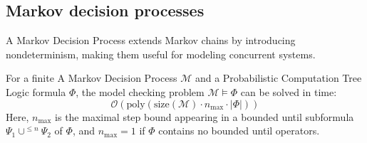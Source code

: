 \subsection{Markov decision processes}
A Markov Decision Process extends Markov chains by introducing nondeterminism, making them useful for modeling concurrent systems.
\begin{theorem}
    For a finite A Markov Decision Process $\mathcal{M}$ and a Probabilistic Computation Tree Logic formula $\Phi$, the model checking problem $\mathcal{M} \models \Phi$ can be solved in time:
       \[\mathcal{O}\left(\text{poly}\left(\text{size}\left(\mathcal{M}\right)\cdot n_{\max}\cdot\left\lvert \Phi\right\rvert\right)\right)\]
    Here, $n_{\max}$ is the maximal step bound appearing in a bounded until subformula $\Psi_1\cup^{\leq n}\Psi_2$ of $\Phi$, and $n_{\max}=1$ if $\Phi$ contains no bounded until operators.
\end{theorem}